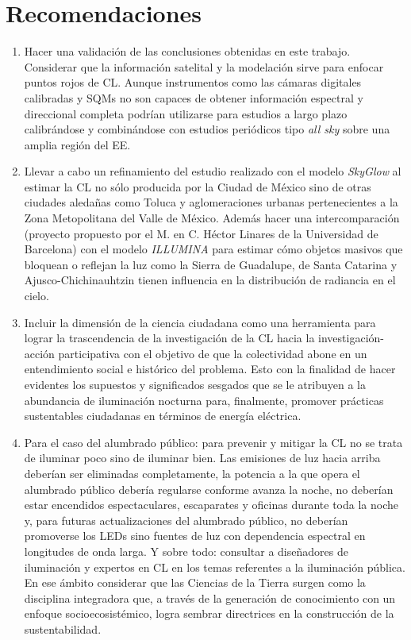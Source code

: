 \chapter{Recomendaciones}
\label{chap:recomendaciones}


\begin{enumerate}[I]

\item Hacer una validación de las conclusiones obtenidas en este trabajo. Considerar que la información satelital y la modelación sirve para enfocar puntos rojos de CL. Aunque instrumentos como las cámaras digitales calibradas y SQMs no son capaces de obtener información espectral y direccional completa podrían utilizarse para estudios a largo plazo calibrándose y combinándose con estudios periódicos tipo \textit{all sky} sobre una amplia región del EE.

\item Llevar a cabo un refinamiento del estudio realizado con el modelo \textit{SkyGlow} al estimar la CL no sólo producida por la Ciudad de México sino de otras ciudades aledañas como Toluca y aglomeraciones urbanas pertenecientes a la Zona Metopolitana del Valle de México. Además hacer una intercomparación (proyecto propuesto por el M. en C. Héctor Linares de la Universidad de Barcelona) con el modelo \textit{ILLUMINA} para estimar cómo objetos masivos que bloquean o reflejan la luz como la Sierra de Guadalupe, de Santa Catarina y Ajusco-Chichinauhtzin tienen influencia en la distribución de radiancia en el cielo.

\item Incluir la dimensión de la ciencia ciudadana como una herramienta para lograr la trascendencia de la investigación de la CL hacia la investigación-acción participativa con el objetivo de que la colectividad abone en un entendimiento social e histórico del problema. Esto con la finalidad de hacer evidentes los supuestos y significados sesgados que se le atribuyen a la abundancia de iluminación nocturna para, finalmente, promover prácticas sustentables ciudadanas en términos de energía eléctrica. 

\item Para el caso del alumbrado público: para prevenir y mitigar la CL no se trata de iluminar poco sino de iluminar bien. Las emisiones de luz hacia arriba deberían ser eliminadas completamente, la potencia a la que opera el alumbrado público debería regularse conforme avanza la noche, no deberían estar encendidos espectaculares, escaparates y oficinas durante toda la noche y, para futuras actualizaciones del alumbrado público, no deberían promoverse los LEDs sino fuentes de luz con dependencia espectral en longitudes de onda larga. Y sobre todo: consultar a diseñadores de iluminación y expertos en CL en los temas referentes a la iluminación pública. En ese ámbito considerar que las Ciencias de la Tierra surgen como la disciplina integradora que, a través de la generación de conocimiento con un enfoque socioecosistémico, logra sembrar directrices en la construcción de la sustentabilidad.


\end{enumerate}
